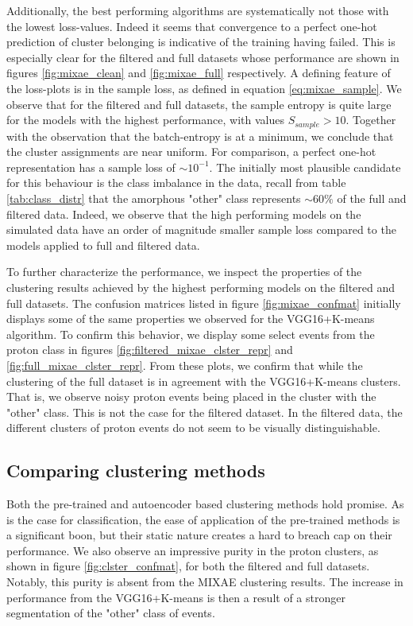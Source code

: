 Additionally, the best performing algorithms are systematically not those with the lowest loss-values. Indeed it seems that convergence to a perfect one-hot prediction of cluster belonging is indicative of the training having failed. This is especially clear for the filtered and full datasets whose performance are shown in figures \ref{fig:mixae_clean} and \ref{fig:mixae_full} respectively. A defining feature of the loss-plots is in the sample loss, as defined in equation \ref{eq:mixae_sample}. We observe that for the filtered and full datasets, the sample entropy is quite large for the models with the highest performance, with values $S_{sample} > 10$. Together with the observation that the batch-entropy is at a minimum, we conclude that the cluster assignments are near uniform. For comparison, a perfect one-hot representation has a sample loss of $\sim 10^{-1}$. The initially most plausible candidate for this behaviour is the class imbalance in the data, recall from table \ref{tab:class_distr} that the amorphous "other" class represents $\sim 60 \%$ of the full and filtered data. Indeed, we observe that the high performing models on the simulated data have an order of magnitude smaller sample loss compared to the models applied to full and filtered data. 

To further characterize the performance, we inspect the properties of the clustering results achieved by the highest performing models on the filtered and full datasets. The confusion matrices listed in figure \ref{fig:mixae_confmat} initially displays some of the same properties we observed for the VGG16+K-means algorithm. To confirm this behavior, we display some select events from the proton class in figures \ref{fig:filtered_mixae_clster_repr} and \ref{fig:full_mixae_clster_repr}. From these plots, we confirm that while the clustering of the full dataset is in agreement with the VGG16+K-means clusters. That is, we observe noisy proton events being placed in the cluster with the "other" class. This is not the case for the filtered dataset. In the filtered data, the different clusters of proton events do not seem to be visually distinguishable.

\subsection{Comparing clustering methods}

Both the pre-trained and autoencoder based clustering methods hold promise. As is the case for classification, the ease of application of the pre-trained methods is a significant boon, but their static nature creates a hard to breach cap on their performance. We also observe an impressive purity in the proton clusters, as shown in figure \ref{fig:clster_confmat}, for both the filtered and full datasets. Notably, this purity is absent from the MIXAE clustering results. The increase in performance from the VGG16+K-means is then a result of a stronger segmentation of the "other" class of events.


